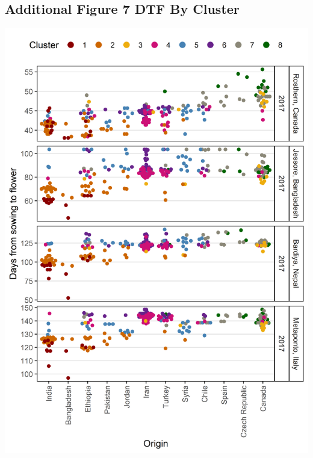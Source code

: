 \documentclass[
]{article}
\begin{document}
\hypertarget{additional-figure-7-dtf-by-cluster}{%
\subsection{Additional Figure 7 DTF By
Cluster}\label{additional-figure-7-dtf-by-cluster}}

\includegraphics{Additional/Additional_Figure_07.png}
\end{document}
